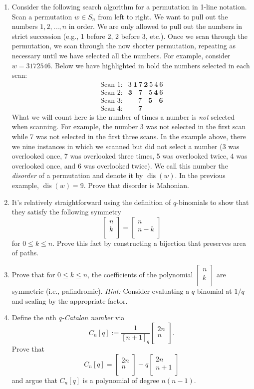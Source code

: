 \documentclass[11pt]{article}
\theoremstyle{definition}
\DeclareMathOperator{\dis}{dis}
\newcommand{\qbinom}[2]{
  \displaystyle \left[\begin{matrix}#1  \\#2  \\ \end{matrix}\right]}
\begin{document}
\begin{enumerate}
\item Consider the following search algorithm for a permutation in 1-line notation.  Scan a permutation $w\in S_n$ from left to right.  We want to pull out the numbers $1,2,\ldots,n$ in order.  We are only allowed to pull out the numbers in strict succession (e.g., 1 before 2, 2 before 3, etc.).  Once we scan through the permutation, we scan through the now shorter permutation, repeating as necessary until we have selected all the numbers.  For example, consider $w=3172546$. Below we have highlighted in bold the numbers selected in each scan:
\begin{eqnarray*}
\text{Scan 1:}& 3\ \mathbf{1}\ 7\ \mathbf{2}\ 5\ 4\ 6\\
\text{Scan 2:}& \mathbf{3}\ \phantom{1}\ 7\ \phantom{2}\ 5\ \mathbf{4}\ 6\\
\text{Scan 3:}& \phantom{3}\ \phantom{1}\ 7\ \phantom{2}\ \mathbf{5}\ \phantom{4}\ \mathbf{6}\\
\text{Scan 4:}& \phantom{3}\ \phantom{1}\ \mathbf{7}\ \phantom{2}\ \phantom{5}\ \phantom{4}\ \phantom{6}
\end{eqnarray*}
What we will count here is the number of times a number is \emph{not} selected when scanning.  For example, the number 3 was not selected in the first scan while 7 was not selected in the first three scans. In the example above, there we nine instances in which we scanned but did not select a number (3 was overlooked once, 7 was overlooked three times, 5 was overlooked twice, 4 was overlooked once, and 6 was overlooked twice).  We call this number the \emph{disorder} of a permutation and denote it by $\dis(w)$. In the previous example, $\dis(w)=9$. Prove that disorder is Mahonian.  

\item It's relatively straightforward using the definition of $q$-binomials to show that they satisfy the following symmetry
\[
\qbinom{n}{k}=\qbinom{n}{n-k}
\]
for $0\leq k\leq n$.  Prove this fact by constructing a bijection that preserves area of paths.

\item Prove that for $0\leq k\leq n$, the coefficients of the polynomial $\qbinom{n}{k}$ are symmetric (i.e., palindromic). \emph{Hint:} Consider evaluating a $q$-binomial at $1/q$ and scaling by the appropriate factor.

\item Define the $n$th \emph{$q$-Catalan number} via
\[
C_n[q]:=\frac{1}{[n+1]_q}\qbinom{2n}{n}.
\]
Prove that
\[
C_n[q]=\qbinom{2n}{n}-q\qbinom{2n}{n+1}
\]
and argue that $C_n[q]$ is a polynomial of degree $n(n-1)$.


\end{enumerate}
\end{document}
